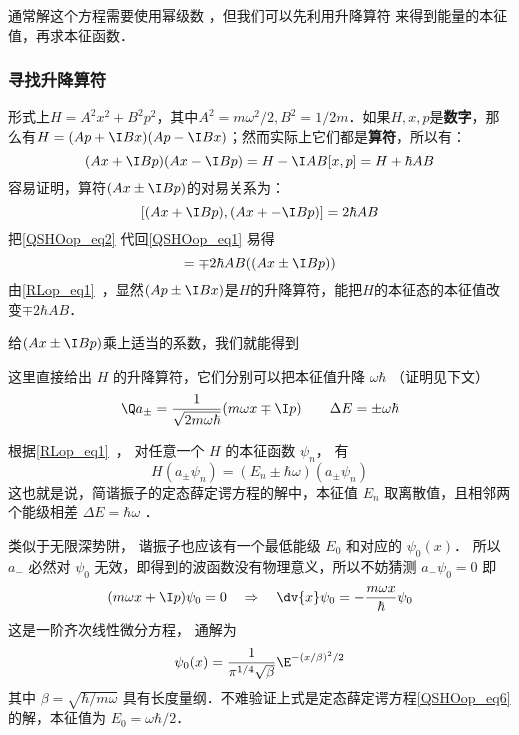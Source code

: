 通常解这个方程需要使用幂级数%
，但我们可以先利用升降算符 来得到能量的本征值，再求本征函数．


\subsubsection{寻找升降算符}

形式上$H=A^2x^2+B^2p^2$，其中$A^2=m\omega^2/2, B^2=1/2m$．如果$H, x, p$是\textbf{数字}，那么有$H = (Ap+\I Bx)(Ap-\I Bx)$；然而实际上它们都是\textbf{算符}，所以有：
\begin{equation}\label{QSHOop_eq1}
(Ax+\I Bp)(Ax-\I Bp) = H-\I AB[x, p] = H+\hbar AB
\end{equation}
容易证明，算符$(Ax\pm\I Bp)$的对易关系为：
\begin{equation}\label{QSHOop_eq2}
[(Ax+\I Bp), (Ax+-\I Bp)] = 2\hbar AB
\end{equation}
把\autoref{QSHOop_eq2} 代回\autoref{QSHOop_eq1} 易得
\begin{equation}
[H, (Ax\pm\I Bp) = [H+ \hbar AB, (Ax\pm\I Bp)] = \mp 2\hbar AB ((Ax\pm\I Bp))
\end{equation}
由\autoref{RLop_eq1}~，显然$(Ap\pm \I Bx)$是$H$的升降算符，能把$H$的本征态的本征值改变$\mp 2\hbar AB$．

给$(Ax\pm\I Bp)$乘上适当的系数，我们就能得到



这里直接给出 $H$ 的升降算符，它们分别可以把本征值升降 $\omega\hbar$ （证明见下文）
\begin{equation}
\Q a_\pm = \frac{1}{\sqrt{2m\omega\hbar}} (m\omega x \mp \I p)
\qquad
\Delta E = \pm \omega \hbar
\end{equation}

根据\autoref{RLop_eq1}~， 对任意一个 $H$ 的本征函数 $\psi_n$， 有
\begin{equation}
H(a_\pm\psi_n) = (E_n\pm\hbar\omega) (a_ \pm \psi_n)
\end{equation}
这也就是说，简谐振子的定态薛定谔方程的解中，本征值 $E_n$ 取离散值，且相邻两个能级相差 $\Delta E = \hbar \omega$ ．

类似于无限深势阱， 谐振子也应该有一个最低能级 $E_0$ 和对应的 $\psi_0(x)$． 所以 $a_-$ 必然对 $\psi_0$ 无效，即得到的波函数没有物理意义，所以不妨猜测 $a_- \psi_0 = 0$ 
即
\begin{equation}
(m\omega x + \I p)\psi_0 = 0
\quad \Rightarrow \quad
\dv{x} \psi_0 =  - \frac{m\omega x}{\hbar } \psi_0
\end{equation}
这是一阶齐次线性微分方程，%
通解为
\begin{equation}
\psi_0(x) = \frac{1}{\pi^{1/4}\sqrt\beta} \E^{-(x/\beta)^2/2}
\end{equation}
其中 $\beta = \sqrt{\hbar /m\omega}$ 具有长度量纲．不难验证上式是定态薛定谔方程\autoref{QSHOop_eq6} 的解，本征值为 $E_0=\omega\hbar/2$．

